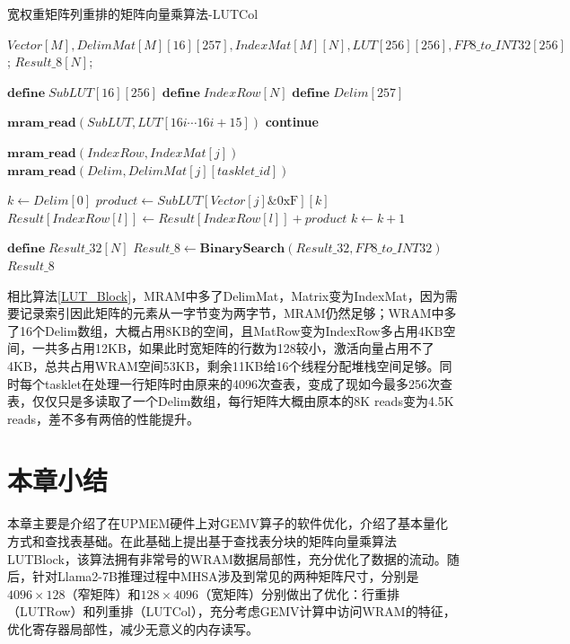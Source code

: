 \begin{algorithm}[!ht]
    \caption{宽权重矩阵列重排的矩阵向量乘算法-LUTCol}
    \label{LUT_Col}
    \begin{algorithmic}[1]
        \Require $Vector[M], DelimMat[M][16][257], IndexMat[M][N], LUT[256][256], FP8\_to\_INT32[256]$; %
        \Ensure $Result\_8[N]$; %

        \State $\textbf{define}\; SubLUT[16][256]$
        \State $\textbf{define}\; IndexRow[N]$
        \State $\textbf{define}\; Delim[257]$

            \State $\textbf{mram\_read}(SubLUT, LUT[16i \cdots 16i + 15])$
            \Comment{\textcolor{blue}{parallel in 16 for each tasklet}}
                    \State \textbf{continue}
                \EndIf
                
                \State $\textbf{mram\_read}(IndexRow, IndexMat[j])$
                \Comment{\textcolor{blue}{parallel in N for each tasklet}}
                \State $\textbf{mram\_read}(Delim, DelimMat[j][tasklet\_id])$

                \State $k \gets Delim[0]$
                    \State $product \gets SubLUT[Vector[j] \& \text{0xF}][k]$
                        \State $Result[IndexRow[l]] \gets Result[IndexRow[l]] + product$
                    \EndFor
                    \State $k \gets k + 1$
                \EndWhile
            \EndFor
        \EndFor

        \State $\textbf{define}\; Result\_32[N]$
        \State $Result\_8 \gets \textbf{BinarySearch}(Result\_32, FP8\_to\_INT32)$
        \Comment{\textcolor{blue}{parallel in N for each tasklet}}
        \State \Return $Result\_8$
    \end{algorithmic}
\end{algorithm}

相比算法\ref{LUT_Block}，MRAM中多了DelimMat，Matrix变为IndexMat，因为需要记录索引因此矩阵的元素从一字节变为两字节，MRAM仍然足够；WRAM中多了16个Delim数组，大概占用8KB的空间，且MatRow变为IndexRow多占用4KB空间，一共多占用12KB，如果此时宽矩阵的行数为128较小，激活向量占用不了4KB，总共占用WRAM空间53KB，剩余11KB给16个线程分配堆栈空间足够。同时每个tasklet在处理一行矩阵时由原来的4096次查表，变成了现如今最多256次查表，仅仅只是多读取了一个Delim数组，每行矩阵大概由原本的8K reads变为4.5K reads，差不多有两倍的性能提升。

\section{本章小结}
本章主要是介绍了在UPMEM硬件上对GEMV算子的软件优化，介绍了基本量化方式和查找表基础。在此基础上提出基于查找表分块的矩阵向量乘算法LUTBlock，该算法拥有非常号的WRAM数据局部性，充分优化了数据的流动。随后，针对Llama2-7B推理过程中MHSA涉及到常见的两种矩阵尺寸，分别是$4096\times 128$（窄矩阵）和$128\times 4096$（宽矩阵）分别做出了优化：行重排（LUTRow）和列重排（LUTCol），充分考虑GEMV计算中访问WRAM的特征，优化寄存器局部性，减少无意义的内存读写。